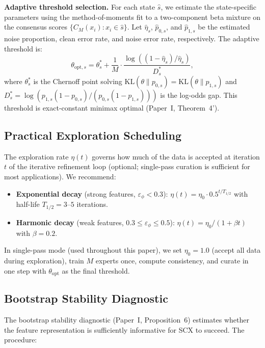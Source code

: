 \textbf{Adaptive threshold selection.} For each state $\hat{s}$, we estimate the state-specific parameters using the method-of-moments fit to a two-component beta mixture on the consensus scores $\{C_M(x_i): x_i \in \hat{s}\}$. Let $\widehat{\eta}_s$, $\widehat{p}_{0,s}$, and $\widehat{p}_{1,s}$ be the estimated noise proportion, clean error rate, and noise error rate, respectively. The adaptive threshold is:
\begin{equation}
\theta_{\mathrm{opt},s} = \theta_s^* + \frac{1}{M} \cdot \frac{\log((1-\widehat{\eta}_s)/\widehat{\eta}_s)}{D_s^*},
\end{equation}
where $\theta_s^*$ is the Chernoff point solving $\mathrm{KL}(\theta\|p_{0,s}) = \mathrm{KL}(\theta\|p_{1,s})$ and $D_s^* = \log(p_{1,s}(1-p_{0,s})/(p_{0,s}(1-p_{1,s})))$ is the log-odds gap. This threshold is exact-constant minimax optimal (Paper~I, Theorem~4').

\subsection{Practical Exploration Scheduling}

The exploration rate $\eta(t)$ governs how much of the data is accepted at iteration $t$ of the iterative refinement loop (optional; single-pass curation is sufficient for most applications). We recommend:

\begin{itemize}
	\item \textbf{Exponential decay} (strong features, $\varepsilon_\phi < 0.3$): $\eta(t) = \eta_0 \cdot 0.5^{t/T_{1/2}}$ with half-life $T_{1/2} = 3$--$5$ iterations.
	\item \textbf{Harmonic decay} (weak features, $0.3 \leq \varepsilon_\phi \leq 0.5$): $\eta(t) = \eta_0 / (1 + \beta t)$ with $\beta = 0.2$.
\end{itemize}

In single-pass mode (used throughout this paper), we set $\eta_0 = 1.0$ (accept all data during exploration), train $M$ experts once, compute consistency, and curate in one step with $\theta_{\mathrm{opt}}$ as the final threshold.

\subsection{Bootstrap Stability Diagnostic}

The bootstrap stability diagnostic (Paper~I, Proposition~6) estimates whether the feature representation is sufficiently informative for SCX to succeed. The procedure:

